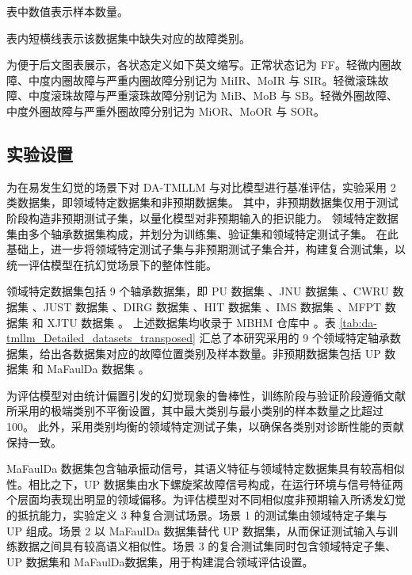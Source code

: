 \begin{table}[htbp]
\begin{threeparttable}
\begin{tablenotes}
            \footnotesize
            \item[a] 表中数值表示样本数量。
            \item[b] 表内短横线表示该数据集中缺失对应的故障类别。
            \item[c] 为便于后文图表展示，各状态定义如下英文缩写。正常状态记为 FF。轻微内圈故障、中度内圈故障与严重内圈故障分别记为 MiIR、MoIR 与 SIR。轻微滚珠故障、中度滚珠故障与严重滚珠故障分别记为 MiB、MoB 与 SB。轻微外圈故障、中度外圈故障与严重外圈故障分别记为 MiOR、MoOR 与 SOR。
        \end{tablenotes}
    \end{threeparttable}
\end{table}

\subsection{实验设置}\label{subsec:DA-TMLLM_experimental_setup}

为在易发生幻觉的场景下对 DA-TMLLM 与对比模型进行基准评估，实验采用 2 类数据集，即领域特定数据集和非预期数据集。
其中，非预期数据集仅用于测试阶段构造非预期测试子集，以量化模型对非预期输入的拒识能力。
领域特定数据集由多个轴承数据集构成，并划分为训练集、验证集和领域特定测试子集。
在此基础上，进一步将领域特定测试子集与非预期测试子集合并，构建复合测试集，以统一评估模型在抗幻觉场景下的整体性能。

领域特定数据集包括 9 个轴承数据集，即 PU 数据集 \cite{PU}、JNU 数据集 \cite{s130608013}、CWRU 数据集 \cite{15467457}、JUST 数据集 \cite{JUST}、DIRG 数据集 \cite{DAGA2019252}、HIT 数据集 \cite{HIT}、IMS 数据集 \cite{IMS}、MFPT 数据集 \cite{MFPT} 和 XJTU 数据集 \cite{XJTU}。
上述数据集均收录于 MBHM 仓库中 \cite{Peng_Liu_Du_Gao_Wang_2025}。表 \ref{tab:da-tmllm_Detailed_datasets_transposed} 汇总了本研究采用的 9 个领域特定轴承数据集，给出各数据集对应的故障位置类别及样本数量。非预期数据集包括 UP 数据集 \cite{UP_dataset} 和 MaFaulDa 数据集 \cite{MaFaulDa_dataset}。

为评估模型对由统计偏置引发的幻觉现象的鲁棒性，训练阶段与验证阶段遵循文献 \cite{20243817051432} 所采用的极端类别不平衡设置，其中最大类别与最小类别的样本数量之比超过 100。
此外，采用类别均衡的领域特定测试子集，以确保各类别对诊断性能的贡献保持一致。

MaFaulDa 数据集包含轴承振动信号，其语义特征与领域特定数据集具有较高相似性。相比之下，UP 数据集由水下螺旋桨故障信号构成，在运行环境与信号特征两个层面均表现出明显的领域偏移。为评估模型对不同相似度非预期输入所诱发幻觉的抵抗能力，实验定义 3 种复合测试场景。场景 1 的测试集由领域特定子集与 UP 组成。场景 2 以 MaFaulDa 数据集替代 UP 数据集，从而保证测试输入与训练数据之间具有较高语义相似性。场景 3 的复合测试集同时包含领域特定子集、UP 数据集和 MaFaulDa数据集，用于构建混合领域评估设置。

